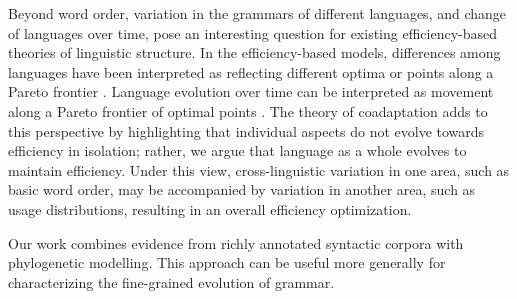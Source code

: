\documentclass[11pt,a4paper]{article}
\begin{document}







Beyond word order, variation in the grammars of different languages, and change of languages over time, pose an interesting question for existing efficiency-based theories of linguistic structure.
In the efficiency-based models, differences among languages have been interpreted as reflecting different optima or points along a Pareto frontier \citep{kemp2018semantic, zaslavsky2018efficient}.
Language evolution over time can be interpreted as movement along a Pareto frontier of optimal points \citep{zaslavsky2019evolution}. %
The theory of coadaptation adds to this perspective by highlighting that individual aspects do not evolve towards efficiency in isolation; rather, we argue that language as a whole evolves to maintain efficiency.
Under this view, cross-linguistic variation in one area, such as basic word order, may be accompanied by variation in another area, such as usage distributions, resulting in an overall efficiency optimization.

Our work combines evidence from richly annotated syntactic corpora with phylogenetic modelling. This  approach can be useful more generally for characterizing the fine-grained evolution of grammar.


\end{document}
